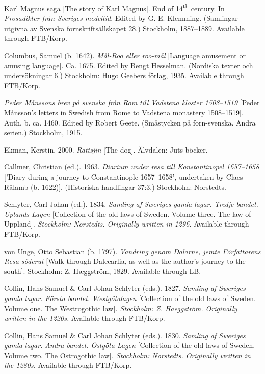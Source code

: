 \documentclass[output=paper]{langscibook}
\begin{document}
\begin{description}[font=\normalfont]
\item[KM:] Karl Magnus saga [The story of Karl Magnus]. End of 14\textsuperscript{th} century. In \textit{Prosadikter från Sveriges medeltid}. Edited by G. E. Klemming. (Samlingar utgivna av Svenska fornskriftsällskapet 28.) Stockholm, 1887–1889. Available through FTB/Korp.
\item[Mål-roo:] Columbus, Samuel (b. 1642). \textit{Mål-Roo eller roo-mål} [Language amusement or amusing language]. Ca. 1675. Edited by Bengt Hesselman. (Nordiska texter och undersökningar 6.) Stockholm: Hugo Geebers förlag, 1935. Available through FTB/Korp.
\item[Måns:] \textit{Peder Månssons brev på svenska från Rom till Vadstena kloster 1508–1519} [Peder Månsson’s letters in Swedish from Rome to Vadstena monastery 1508–1519]. Auth. b. ca. 1460. Edited by Robert Geete. (Småstycken på forn-svenska. Andra serien.) Stockholm, 1915.
\item[Rattsjin:] Ekman, Kerstin. 2000. \textit{Rattsjin} [The dog]. Älvdalen: Juts böcker. 
\item[Rålamb:] Callmer, Christian (ed.). 1963. \textit{Diarium under resa till Konstantinopel 1657–1658} [’Diary during a journey to Constantinople 1657–1658’, undertaken by Claes Rålamb (b. 1622)]. (Historiska handlingar 37:3.) Stockholm: Norstedts.
\item[UL:] Schlyter, Carl Johan (ed.). 1834. \emph{Samling af Sweriges gamla lagar. Tredje bandet.} \textit{Uplands-Lagen} [Collection of the old laws of Sweden. Volume three. The law of Uppland]\emph{. Stockholm: Norstedts. Originally written in 1296.} Available through FTB/Korp.
\item[von Unge:] von Unge, Otto Sebastian (b. 1797). \textit{Vandring genom Dalarne, jemte Författarens Resa söderut} [Walk through Dalecarlia, as well as the author’s journey to the south]. Stockholm: Z. Hæggström, 1829. Available through LB.
\item[EWL:] Collin, Hans Samuel \& Carl Johan Schlyter (eds.). 1827. \emph{Samling af Sweriges gamla lagar. Första bandet. Westgötalagen} [Collection of the old laws of Sweden. Volume one. The Westrogothic law]\emph{. Stockholm: Z. Haeggström. Originally written in the 1220s.} Available through FTB/Korp.~
\item[ÖgL:] Collin, Hans Samuel \& Carl Johan Schlyter (eds.). 1830. \emph{Samling af Sweriges gamla lagar. Andra bandet.} \textit{Östgöta-Lagen} [Collection of the old laws of Sweden. Volume two. The Ostrogothic law]\emph{. Stockholm: Norstedts. Originally written in the 1280s.} Available through FTB/Korp.
\end{description}
\end{document}
